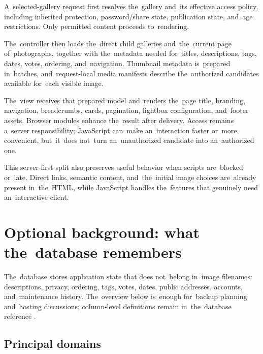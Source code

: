 \documentclass[11pt,a4paper]{article}
\begin{document}
A~selected-gallery request first resolves the~gallery and~its effective access
policy, including inherited protection, password/share state, publication state,
and~age restrictions. Only permitted content proceeds to~rendering.

The~controller then loads the~direct child galleries and~the~current page
of~photographs, together with the~metadata needed for~titles, descriptions,
tags, dates, votes, ordering, and~navigation. Thumbnail metadata is~prepared
in~batches, and~request-local media manifests describe the~authorized candidates
available for~each visible image.

The~view receives that prepared model and~renders the~page title, branding,
navigation, breadcrumbs, cards, pagination, lightbox configuration, and~footer
assets. Browser modules enhance the~result after delivery. Access remains
a~server responsibility; JavaScript can~make an~interaction faster or~more
convenient, but~it~does not~turn an~unauthorized candidate into an~authorized
one.

This server-first split also preserves useful behavior when scripts are~blocked
or~late. Direct links, semantic content, and~the~initial image choices
are~already present in~the~HTML, while JavaScript handles the~features that
genuinely need an~interactive client.

\section{Optional background: what the~database remembers}
\label{sec:database}

The~database stores application state that does not~belong in~image filenames:
descriptions, privacy, ordering, tags, votes, dates, public addresses, accounts,
and~maintenance history. The~overview below is~enough for~backup planning
and~hosting discussions; column-level definitions remain in~the~database
reference \cite{database}.

\subsection{Principal domains}
\end{document}
